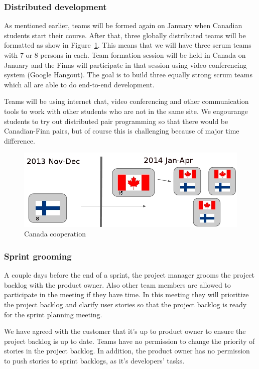 \subsubsection{Distributed development}

As mentioned earlier, teams will be formed again on January when
Canadian students start their course. After that, three globally
distributed teams will be formatted as show in Figure~\ref{fig:cooperation}.
This means that we will have three scrum teams with 7 or 8 persons in each. Team
formation session will be held in Canada on January and the Finns will
participate in that session using video conferencing system (Google Hangout).
The goal is to build three equally strong scrum teams which all are able to do
end-to-end development.

Teams will be using internet chat, video conferencing and other
communication tools to work with other students who are not in the same site. We
engourange students to try out distributed pair programming so that there would
be Canadian-Finn pairs, but of course this is challenging because of major time
difference.

\begin{figure}[H]
\centering
\includegraphics[width=1\textwidth]{imgs/canadacooperation.jpg}
\caption{Canada cooperation}
\label{fig:cooperation}
\end{figure}

\subsubsection{Sprint grooming}

A couple days before the end of a sprint, the project manager grooms the
project backlog with the product owner. Also other team members are allowed to
participate in the meeting if they have time. In this meeting they will
prioritize the project backlog and clarify user stories so that the project
backlog is ready for the sprint planning meeting.

We have agreed with the customer that it's up to product owner to ensure the
project backlog is up to date. Teams have no permission to change the priority
of stories in the project backlog. In addition, the product owner has no
permission to push stories to sprint backlogs, as it's developers' tasks.


